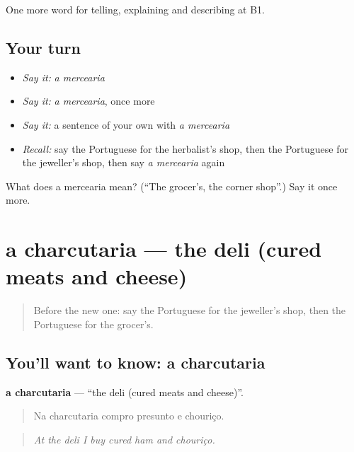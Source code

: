 \begin{grammarlens}[title={What you've built}]
One more word for telling, explaining and describing at B1.
\end{grammarlens}

\subsection*{Your turn}
\begin{itemize}
\raggedright
  \item \emph{Say it:} \emph{a mercearia}
  \item \emph{Say it:} \emph{a mercearia}, once more
  \item \emph{Say it:} a sentence of your own with \emph{a mercearia}
  \item \emph{Recall:} say the Portuguese for the herbalist's shop, then the Portuguese for the jeweller's shop, then say \emph{a mercearia} again
\end{itemize}

\begin{tcolorbox}[breakable,colback=teal!4,colframe=teal!35!black,title={Before you move on}]
What does a mercearia mean? (\textquotedblleft{}The grocer's, the corner shop\textquotedblright{}.) Say it once more.
\end{tcolorbox}
\section[a charcutaria]{a charcutaria — the deli (cured meats and cheese)}

\label{lesson:PT-C450-charcutaria}



\begin{quote}
Before the new one: say the Portuguese for the jeweller's shop, then the Portuguese for the grocer's.
\end{quote}

\subsection*{You'll want to know: a charcutaria}
\textbf{a charcutaria} — \textquotedblleft{}the deli (cured meats and cheese)\textquotedblright{}.

\begin{quote}
Na charcutaria compro presunto e chouriço.
\end{quote}

\begin{quote}
\emph{At the deli I buy cured ham and chouriço.}
\end{quote}

